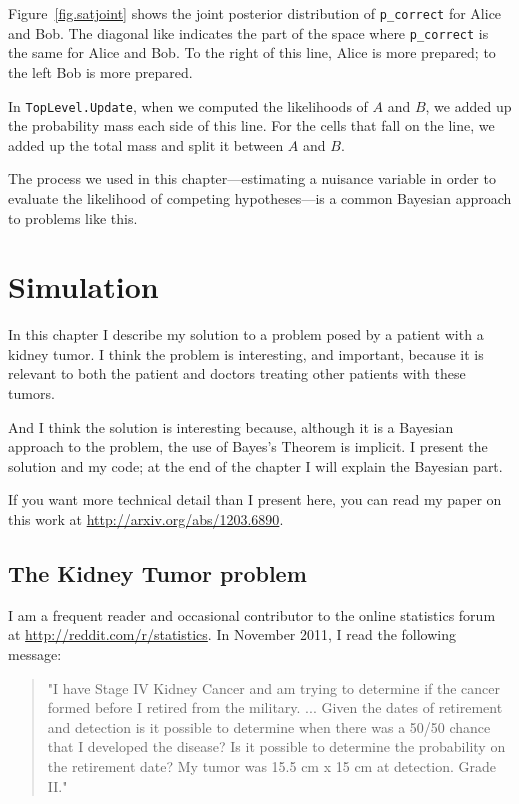 \documentclass[12pt]{book}
\begin{document}
Figure~\ref{fig.satjoint} shows the joint posterior distribution of
\verb"p_correct" for Alice and Bob.  The diagonal like indicates the
part of the space where \verb"p_correct" is the same for Alice and
Bob.  To the right of this line, Alice is more prepared; to the left
Bob is more prepared.

In {\tt TopLevel.Update}, when we computed the likelihoods of $A$ and
$B$, we added up the probability mass each side of this line.  For the
cells that fall on the line, we added up the total mass and split it
between $A$ and $B$.

The process we used in this chapter---estimating a nuisance
variable in order to evaluate the likelihood of competing
hypotheses---is a common Bayesian approach to problems like this.




\chapter{Simulation}

In this chapter I describe my solution to a problem posed
by a patient with a kidney tumor.  I think the problem is interesting,
and important, because it is relevant to both the patient and
doctors treating other patients with these tumors.

And I think the solution is interesting because, although it
is a Bayesian approach to the problem, the use of Bayes's Theorem
is implicit.  I present the solution and my code; at the end
of the chapter I will explain the Bayesian part.

If you want more technical detail than I present here, you can
read my paper on this work at \url{http://arxiv.org/abs/1203.6890}.


\section{The Kidney Tumor problem}

I am a frequent reader and occasional contributor to the online statistics
forum at \url{http://reddit.com/r/statistics}.  In November 2011, I read
the following message:

\begin{quote}
"I have Stage IV Kidney Cancer and am trying to determine if the
  cancer formed before I retired from the military. ... Given the
  dates of retirement and detection is it possible to determine when
  there was a 50/50 chance that I developed the disease? Is it
  possible to determine the probability on the retirement date?  My
  tumor was 15.5 cm x 15 cm at detection. Grade II."
\end{quote}
\end{document}
